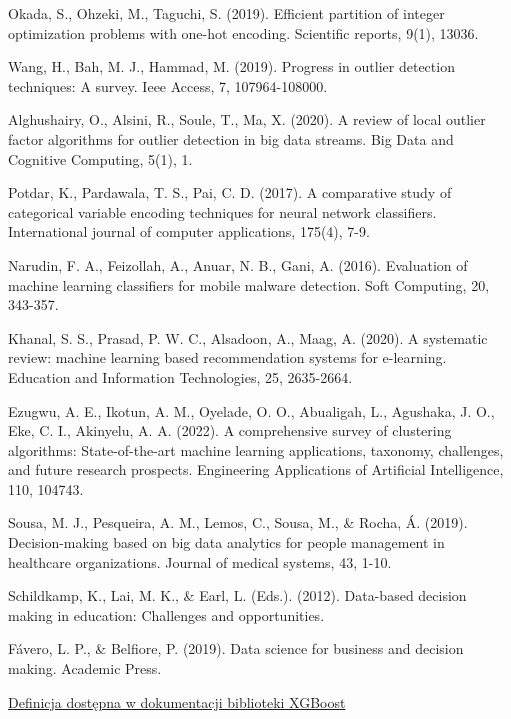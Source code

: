 \documentclass{book}
\begin{document}
\begin{thebibliography}{9}
    Okada, S., Ohzeki, M., Taguchi, S. (2019). Efficient partition of integer optimization problems with one-hot encoding. Scientific reports, 9(1), 13036.
    
    Wang, H., Bah, M. J., Hammad, M. (2019). Progress in outlier detection techniques: A survey. Ieee Access, 7, 107964-108000.

    Alghushairy, O., Alsini, R., Soule, T., Ma, X. (2020). A review of local outlier factor algorithms for outlier detection in big data streams. Big Data and Cognitive Computing, 5(1), 1.
    
    Potdar, K., Pardawala, T. S., Pai, C. D. (2017). A comparative study of categorical variable encoding techniques for neural network classifiers. International journal of computer applications, 175(4), 7-9.

    Narudin, F. A., Feizollah, A., Anuar, N. B., Gani, A. (2016). Evaluation of machine learning classifiers for mobile malware detection. Soft Computing, 20, 343-357.
    
    Khanal, S. S., Prasad, P. W. C., Alsadoon, A., Maag, A. (2020). A systematic review: machine learning based recommendation systems for e-learning. Education and Information Technologies, 25, 2635-2664.

    Ezugwu, A. E., Ikotun, A. M., Oyelade, O. O., Abualigah, L., Agushaka, J. O., Eke, C. I.,  Akinyelu, A. A. (2022). A comprehensive survey of clustering algorithms: State-of-the-art machine learning applications, taxonomy, challenges, and future research prospects. Engineering Applications of Artificial Intelligence, 110, 104743.
    
    Sousa, M. J., Pesqueira, A. M., Lemos, C., Sousa, M., \& Rocha, Á. (2019). Decision-making based on big data analytics for people management in healthcare organizations. Journal of medical systems, 43, 1-10.

    Schildkamp, K., Lai, M. K., \& Earl, L. (Eds.). (2012). Data-based decision making in education: Challenges and opportunities.

    Fávero, L. P., \& Belfiore, P. (2019). Data science for business and decision making. Academic Press.

    \href{https://xgboost.readthedocs.io/en/stable/}{Definicja dostępna w dokumentacji biblioteki XGBoost}


\end{thebibliography}
\end{document}
